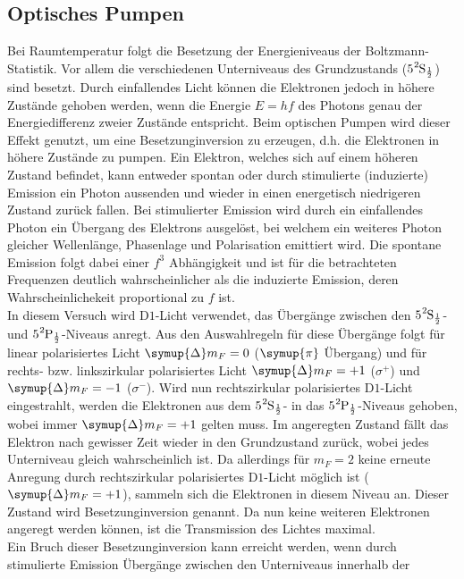\subsection{Optisches Pumpen}
Bei Raumtemperatur folgt die Besetzung der Energieniveaus der Boltzmann-Statistik. Vor allem die verschiedenen Unterniveaus des Grundzustands 
($5\ce{^{2}\text{S}_{\frac{1}{2}}}$) sind besetzt. Durch einfallendes Licht können die Elektronen jedoch in höhere Zustände gehoben werden, wenn 
die Energie $E = hf$ des Photons genau der Energiedifferenz zweier Zustände entspricht. Beim optischen Pumpen wird dieser Effekt genutzt, um eine 
Besetzunginversion zu erzeugen, d.h. die Elektronen in höhere Zustände zu pumpen.
Ein Elektron, welches sich auf einem höheren Zustand befindet, kann entweder spontan oder durch stimulierte (induzierte) Emission ein Photon aussenden und 
wieder in einen energetisch niedrigeren Zustand zurück fallen. Bei stimulierter Emission wird durch ein einfallendes Photon ein Übergang des Elektrons
ausgelöst, bei welchem ein weiteres Photon gleicher Wellenlänge, Phasenlage und Polarisation emittiert wird.
Die spontane Emission folgt dabei einer $f^3$ Abhängigkeit und ist für die betrachteten Frequenzen 
deutlich wahrscheinlicher als die induzierte Emission, deren Wahrscheinlichekeit proportional zu $f$ ist. \\
In diesem Versuch wird $\text{D}1$-Licht verwendet, das Übergänge zwischen den $5\ce{^{2}\text{S}_{\frac{1}{2}}}$- und 
$5\ce{^{2}\text{P}_{\frac{1}{2}}}$-Niveaus anregt. Aus den Auswahlregeln für diese Übergänge folgt für linear polarisiertes Licht $\symup{\Delta}m_F = 0$
($\symup{\pi}$ Übergang) und für rechts- bzw. linkszirkular polarisiertes Licht $\symup{\Delta}m_F = +1$ ($\sigma^+$) und $\symup{\Delta}m_F = -1$ ($\sigma^-$).
Wird nun rechtszirkular polarisiertes $\text{D}1$-Licht eingestrahlt, werden die Elektronen aus dem $5\ce{^{2}\text{S}_{\frac{1}{2}}}$- in das 
$5\ce{^{2}\text{P}_{\frac{1}{2}}}$-Niveaus gehoben, wobei immer  $\symup{\Delta}m_F = +1$ gelten muss. Im angeregten Zustand fällt das Elektron nach gewisser
Zeit wieder in den Grundzustand zurück, wobei jedes Unterniveau gleich wahrscheinlich ist. Da allerdings für $m_F = 2$ keine erneute Anregung durch rechtszirkular
polarisiertes $\text{D}1$-Licht möglich ist ($\symup{\Delta}m_F = +1$), sammeln sich die Elektronen in diesem Niveau an. Dieser Zustand wird Besetzunginversion genannt.
Da nun keine weiteren Elektronen angeregt werden können, ist die Transmission des Lichtes maximal. \\
Ein Bruch dieser Besetzunginversion kann erreicht werden, wenn durch stimulierte Emission Übergänge zwischen den Unterniveaus innerhalb der 
